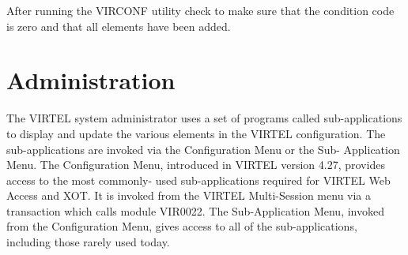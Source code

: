 \documentclass[letterpaper,10pt,english]{sphinxmanual}
\begin{document}
\begin{sphinxVerbatim}[commandchars=\\\{\}]
                                                     
                             
                                                        
                                                      
                                                          
                                                            
                                                   
                                                       
                                                           
                                                         
                                                         
\end{sphinxVerbatim}


After running the VIRCONF utility check to make sure that the condition code is zero and that all elements have been added.

\newpage


\section{Administration}
\label{\detokenize{connectivity_guide:administration}}\label{\detokenize{connectivity_guide:index-0}}
The VIRTEL system administrator uses a set of programs called sub-applications to display and update the various elements in the VIRTEL configuration. The sub-applications are invoked via the Configuration Menu or the Sub- Application Menu. The Configuration Menu, introduced in VIRTEL version 4.27, provides access to the most commonly- used sub-applications required for VIRTEL Web Access and XOT. It is invoked from the VIRTEL Multi-Session menu via a transaction which calls module VIR0022. The Sub-Application Menu,
invoked from the Configuration Menu, gives access to all of the sub-applications, including those rarely used today.
\end{document}
